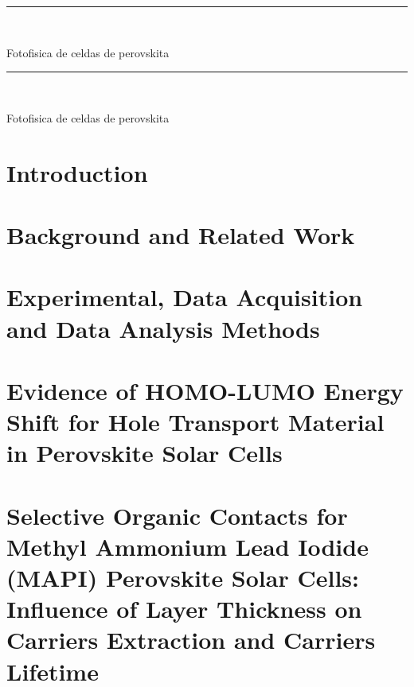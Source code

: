 \documentclass[b5paper, 12pt, openright]{book} %
\begin{document}
{
	\vfill
	\centering \rule{5cm}{1pt}\\
	\vfill
}
\EnableQuotes
\noindent

Fotofisica de celdas de perovskita

{
	\vfill
	\centering \rule{5cm}{1pt}\\
	\vfill
}
\noindent

Fotofisica de celdas de perovskita

\vfill

\EnableQuotes

\restoregeometry


\mainmatter
\pagestyle{headings}


\chapter{Introduction}
	\graphicspath{ {./contents_img/intro/} }
	

\chapter{Background and Related Work}
	\graphicspath{ {./contents_img/background/} }
	

\chapter{Experimental, Data Acquisition and Data Analysis Methods}
	\graphicspath{ {./contents_img/methods/} }
	

\chapter{Evidence of HOMO-LUMO Energy Shift for Hole Transport Material in Perovskite Solar Cells}
	\graphicspath{ {./contents_img/tae/} }
	

\chapter{Selective Organic Contacts for Methyl Ammonium Lead Iodide (MAPI) Perovskite Solar Cells: Influence of Layer Thickness on Carriers Extraction and Carriers Lifetime}
	\graphicspath{ {./contents_img/thicknesses/} }
	
	
\end{document}
